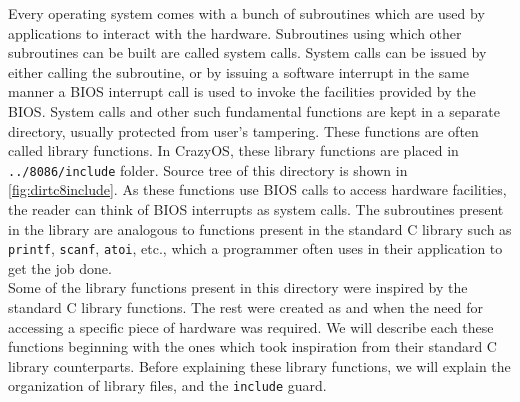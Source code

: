Every operating system comes with a bunch of subroutines which are used by applications to interact with the hardware. Subroutines using which other subroutines can be built are called system calls. System calls can be issued by either calling the subroutine, or by issuing a software interrupt in the same manner a BIOS interrupt call is used to invoke the facilities provided by the BIOS. System calls and other such fundamental functions are kept in a separate directory, usually protected from user's tampering. These functions are often called library functions. In CrazyOS, these library functions are placed in \texttt{../8086/include} folder. Source tree of this directory is shown in \autoref{fig:dirtc8include}. As these functions use BIOS calls to access hardware facilities, the reader can think of BIOS interrupts as system calls. The subroutines present in the library are analogous to functions present in the standard C library such as \texttt{printf}, \texttt{scanf}, \texttt{atoi}, etc., which a programmer often uses in their application to get the job done.\\
Some of the library functions present in this directory were inspired by the standard C library functions. The rest were created as and when the need for accessing a specific piece of hardware was required. We will describe each these functions beginning with the ones which took inspiration from their standard C library counterparts. Before explaining these library functions, we will explain the organization of library files, and the \texttt{include} guard.

